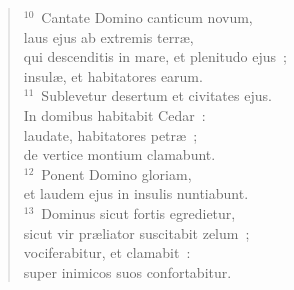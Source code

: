 \begin{flushleft}\begin{verse}${}^{10}$~Cantate Domino canticum novum,\\ laus ejus ab extremis terr\ae ,\\ qui descenditis in mare, et plenitudo ejus~;\\ insul\ae , et habitatores earum.\\
${}^{11}$~Sublevetur desertum et civitates ejus.\\ In domibus habitabit Cedar~:\\ laudate, habitatores petr\ae~;\\ de vertice montium clamabunt.\\
${}^{12}$~Ponent Domino gloriam,\\ et laudem ejus in insulis nuntiabunt.\\
${}^{13}$~Dominus sicut fortis egredietur,\\ sicut vir pr\ae liator suscitabit zelum~;\\ vociferabitur, et clamabit~:\\ super inimicos suos confortabitur.\end{verse}\end{flushleft}


